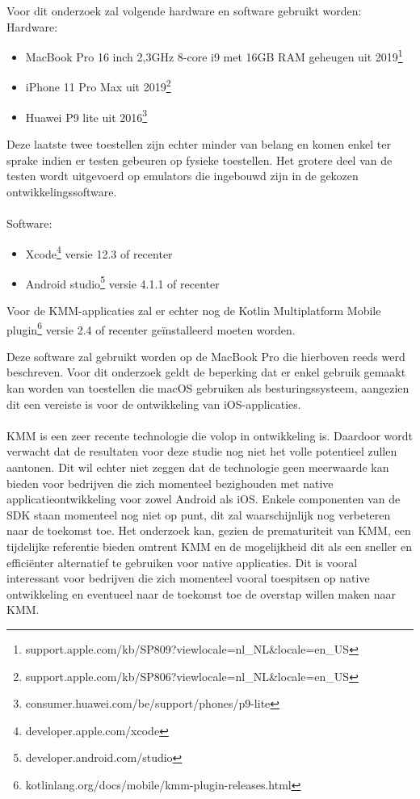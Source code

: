 Voor dit onderzoek zal volgende hardware en software gebruikt worden:\\
Hardware:
\begin{itemize}
    \item MacBook Pro 16 inch 2,3GHz 8-core i9 met 16GB RAM geheugen uit 2019\footnote{support.apple.com/kb/SP809?viewlocale=nl\_NL\&locale=en\_US}
    \item iPhone 11 Pro Max uit 2019\footnote{support.apple.com/kb/SP806?viewlocale=nl\_NL\&locale=en\_US}
    \item Huawei P9 lite uit 2016\footnote{consumer.huawei.com/be/support/phones/p9-lite}
\end{itemize}
Deze laatste twee toestellen zijn echter minder van belang en komen enkel ter sprake indien er testen gebeuren op fysieke toestellen. Het grotere deel van de testen wordt uitgevoerd op emulators die ingebouwd zijn in de gekozen ontwikkelingssoftware.\\
\\
Software:
\begin{itemize}
    \item Xcode\footnote{developer.apple.com/xcode} versie 12.3 of recenter
    \item Android studio\footnote{developer.android.com/studio} versie 4.1.1 of recenter
\end{itemize}
Voor de KMM-applicaties zal er echter nog de Kotlin Multiplatform Mobile plugin\footnote{kotlinlang.org/docs/mobile/kmm-plugin-releases.html} versie 2.4 of recenter geïnstalleerd moeten worden.

Deze software zal gebruikt worden op de MacBook Pro die hierboven reeds werd beschreven. Voor dit onderzoek geldt de beperking dat er enkel gebruik gemaakt kan worden van toestellen die macOS gebruiken als besturingssysteem, aangezien dit een vereiste is voor de ontwikkeling van iOS-applicaties.
\\ \\ 
KMM is een zeer recente technologie die volop in ontwikkeling is. Daardoor wordt verwacht dat de resultaten voor deze studie nog niet het volle potentieel zullen aantonen. Dit wil echter niet zeggen dat de technologie geen meerwaarde kan bieden voor bedrijven die zich momenteel bezighouden met native applicatieontwikkeling voor zowel Android als iOS. Enkele componenten van de SDK staan momenteel nog niet op punt, dit zal waarschijnlijk nog verbeteren naar de toekomst toe. Het onderzoek kan, gezien de prematuriteit van KMM, een tijdelijke referentie bieden omtrent KMM en de mogelijkheid dit als een sneller en efficiënter alternatief te gebruiken voor native applicaties. Dit is vooral interessant voor bedrijven die zich momenteel vooral toespitsen op native ontwikkeling en eventueel naar de toekomst toe de overstap willen maken naar KMM. 


